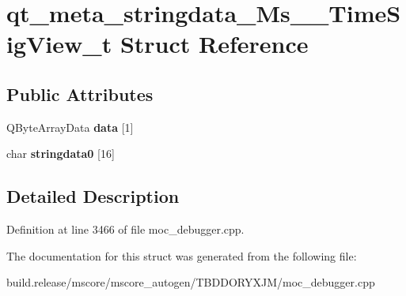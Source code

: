 \hypertarget{structqt__meta__stringdata___ms_____time_sig_view__t}{}\section{qt\+\_\+meta\+\_\+stringdata\+\_\+\+Ms\+\_\+\+\_\+\+Time\+Sig\+View\+\_\+t Struct Reference}
\label{structqt__meta__stringdata___ms_____time_sig_view__t}
\subsection*{Public Attributes}
\begin{DoxyCompactItemize}
\item 
\mbox{\label{structqt__meta__stringdata___ms_____time_sig_view__t_adca0b3cf9058fb02354feb5efaaffd05}} 
Q\+Byte\+Array\+Data {\bfseries data} \mbox{[}1\mbox{]}
\item 
\mbox{\label{structqt__meta__stringdata___ms_____time_sig_view__t_ac2cf75d95cb57c151a7c75967e6478e9}} 
char {\bfseries stringdata0} \mbox{[}16\mbox{]}
\end{DoxyCompactItemize}


\subsection{Detailed Description}


Definition at line 3466 of file moc\+\_\+debugger.\+cpp.



The documentation for this struct was generated from the following file\+:\begin{DoxyCompactItemize}
\item 
build.\+release/mscore/mscore\+\_\+autogen/\+T\+B\+D\+D\+O\+R\+Y\+X\+J\+M/moc\+\_\+debugger.\+cpp\end{DoxyCompactItemize}
